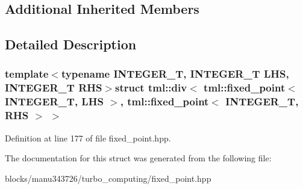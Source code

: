 \subsection*{Additional Inherited Members}


\subsection{Detailed Description}
\subsubsection*{template$<$typename I\+N\+T\+E\+G\+E\+R\+\_\+\+T, I\+N\+T\+E\+G\+E\+R\+\_\+\+T L\+H\+S, I\+N\+T\+E\+G\+E\+R\+\_\+\+T R\+H\+S$>$struct tml\+::div$<$ tml\+::fixed\+\_\+point$<$ I\+N\+T\+E\+G\+E\+R\+\_\+\+T, L\+H\+S $>$, tml\+::fixed\+\_\+point$<$ I\+N\+T\+E\+G\+E\+R\+\_\+\+T, R\+H\+S $>$ $>$}



Definition at line 177 of file fixed\+\_\+point.\+hpp.



The documentation for this struct was generated from the following file\+:\begin{DoxyCompactItemize}
\item 
blocks/manu343726/turbo\+\_\+computing/fixed\+\_\+point.\+hpp\end{DoxyCompactItemize}
